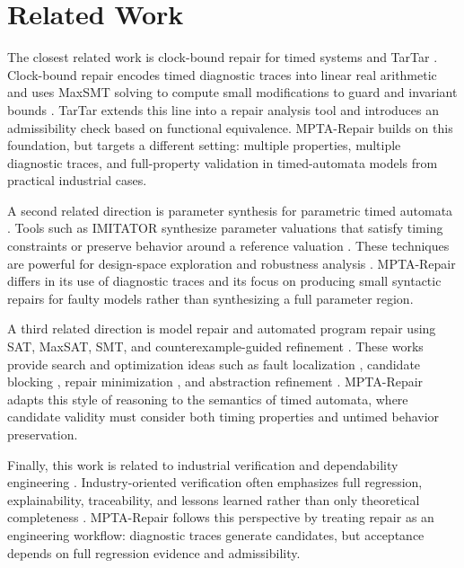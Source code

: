 ﻿\section{Related Work}
\label{sec:related-work}

The closest related work is clock-bound repair for timed systems and
TarTar \cite{leue2019clock}. Clock-bound repair encodes timed diagnostic traces into
linear real arithmetic and uses MaxSMT solving to compute small
modifications to guard and invariant bounds \cite{leue2019clock}. TarTar extends this
line into a repair analysis tool and introduces an admissibility check
based on functional equivalence. MPTA-Repair builds on this foundation,
but targets a different setting: multiple properties, multiple
diagnostic traces, and full-property validation in timed-automata
models from practical industrial cases.

A second related direction is parameter synthesis for parametric timed
automata \cite{alur1993parametric}. Tools such as IMITATOR synthesize parameter valuations
that satisfy timing constraints or preserve behavior around a reference
valuation \cite{andre2010imitator}. These techniques are powerful for design-space
exploration and robustness analysis \cite{bendik2021robustness}. MPTA-Repair differs in its
use of diagnostic traces and its focus on producing small syntactic
repairs for faulty models rather than synthesizing a full parameter
region.

A third related direction is model repair and automated program repair
using SAT, MaxSAT, SMT, and counterexample-guided refinement \cite{weimer2009automatically}.
These works provide search and optimization ideas such as fault
localization \cite{jose2011bugassist}, candidate blocking \cite{mechtaev2016angelix}, repair minimization
\cite{nguyen2013semfix}, and abstraction refinement \cite{clarke2000cegar}. MPTA-Repair adapts this
style of reasoning to the semantics of timed automata, where candidate
validity must consider both timing properties and untimed behavior
preservation.

Finally, this work is related to industrial verification and
dependability engineering \cite{leveson2011safer}. Industry-oriented verification often
emphasizes full regression, explainability, traceability, and lessons
learned rather than only theoretical completeness \cite{clarke2018handbook}. MPTA-Repair
follows this perspective by treating repair as an engineering workflow:
diagnostic traces generate candidates, but acceptance depends on full
regression evidence and admissibility.

